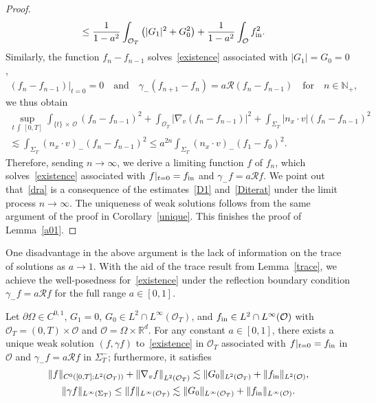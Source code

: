 \documentclass[10pt]{amsart}
\theoremstyle{definition}\newtheorem{defi}[theo]{Definition}\newtheorem{rema}[theo]{Remark}\newtheorem{exam}[theo]{Example}\newtheorem{exem}[theo]{Example}\newtheorem{nota}[theo]{Notation}
\newcommand*\p{\partial}
\newcommand*\fin {f_{\rm in}}
\newcommand*\N {\mathbb{N}}
\newcommand*\R {\mathbb{R}}
\newcommand*\RR {\mathcal{R}}
\newcommand*\OO {\mathcal{O}}
\begin{document}
\begin{proof}
\begin{equation}
\begin{split}
\le \frac{1}{1-a^2} \int_{\OO_T}\left(|G_1|^2 + G_0^2\right) + \frac{1}{1-a^2} \int_{\OO}\fin^2 &.
\end{split}
\end{equation}
Similarly, the function $f_{n}-f_{n-1}$ solves~\eqref{existence} associated with $|G_1|=G_0=0$,
\begin{align*}
\left(f_{n}-f_{n-1}\right)|_{t=0}=0 \quad\text{and}\quad
\gamma_-\left(f_{n+1}-f_n\right)=a\RR\left(f_{n}-f_{n-1}\right)\quad\text{for}\quad n\in\N_+,
\end{align*}
we thus obtain
\begin{multline*}
\sup_{t\,\int\,[0,T]}\int_{\{t\}\,\times\,\OO} \left(f_{n}-f_{n-1}\right)^2 + \int_{\OO_T} \left|\nabla_v\left(f_{n}-f_{n-1}\right)\right|^2 +\int_{\Sigma_T} \left|n_x\cdot v\right|\left(f_{n}-f_{n-1}\right)^2\\
\lesssim \int_{\Sigma_T} (n_x\cdot v)_-\left(f_{n}-f_{n-1}\right)^2
\le a^{2n}\int_{\Sigma_T} (n_x\cdot v)_-\left(f_{1}-f_{0}\right)^2.
\end{multline*}
Therefore, sending $n\rightarrow\infty$, we derive a limiting function $f$ of $f_n$, which solves~\eqref{existence} associated with $f|_{t=0}=\fin$ and $\gamma_-f=a\RR f$. We point out that~\eqref{dra} is a consequence of the estimates~\eqref{D1} and~\eqref{Diterat} under the limit process $n\rightarrow\infty$. The uniqueness of weak solutions follows from the same argument of the proof in Corollary~\ref{unique}. This finishes the proof of Lemma~\ref{a01}.
\end{proof}

One disadvantage in the above argument is the lack of information on the trace of solutions as $a\rightarrow1$. With the aid of the trace result from Lemma~\ref{trace}, we achieve the well-posedness for~\eqref{existence} under the reflection boundary condition $\gamma_-f=a\RR f$ for the full range $a\in[0,1]$.

\begin{coro}\label{globalre}
Let $\p\Omega\in C^{0,1}$, $G_1=0$, $G_0\in L^2\cap L^\infty(\OO_T)$, and $\fin\in L^2\cap L^\infty(\OO)$ with $\OO_T=(0,T)\times\OO$ and $\OO=\Omega\times\R^d$. For any constant $a\in[0,1]$, there exists a unique weak solution $(f,\gamma f)$ to~\eqref{existence} in $\OO_T$ associated with $f|_{t=0}=\fin$ in $\OO$ and $\gamma_-f=a\RR f$ in $\Sigma_T^-$; furthermore, it satisfies
\begin{multline}\label{drglobal}
\|f\|_{C^0\left([0,T];L^2(\OO_T)\right)} + \left\|\nabla_vf\right\|_{L^2(\OO_T)}
\lesssim \|G_0\|_{L^2(\OO_T)} + \|\fin\|_{L^2(\OO)}, \\
\|\gamma f\|_{L^\infty(\Sigma_T)}
\le\|f\|_{L^\infty(\OO_T)}
\lesssim \|G_0\|_{L^\infty(\OO_T)} + \|\fin\|_{L^\infty(\OO)}.
\end{multline}
\end{coro}
\end{document}
